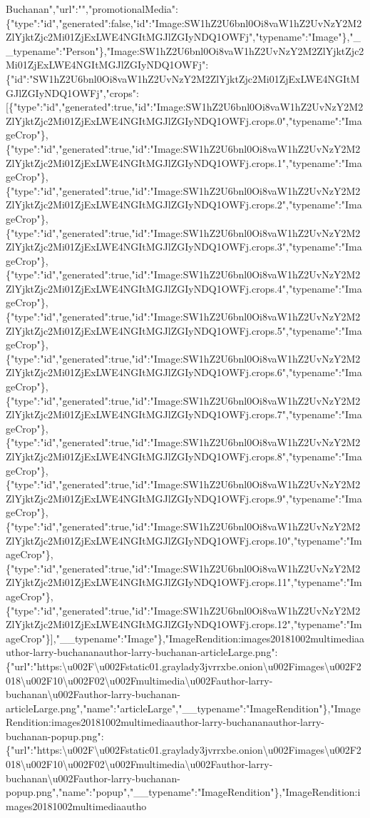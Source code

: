 Buchanan","url":"","promotionalMedia":\{"type":"id","generated":false,"id":"Image:SW1hZ2U6bnl0Oi8vaW1hZ2UvNzY2M2ZlYjktZjc2Mi01ZjExLWE4NGItMGJlZGIyNDQ1OWFj","typename":"Image"\},"\_\_typename":"Person"\},"Image:SW1hZ2U6bnl0Oi8vaW1hZ2UvNzY2M2ZlYjktZjc2Mi01ZjExLWE4NGItMGJlZGIyNDQ1OWFj":\{"id":"SW1hZ2U6bnl0Oi8vaW1hZ2UvNzY2M2ZlYjktZjc2Mi01ZjExLWE4NGItMGJlZGIyNDQ1OWFj","crops":{[}\{"type":"id","generated":true,"id":"Image:SW1hZ2U6bnl0Oi8vaW1hZ2UvNzY2M2ZlYjktZjc2Mi01ZjExLWE4NGItMGJlZGIyNDQ1OWFj.crops.0","typename":"ImageCrop"\},\{"type":"id","generated":true,"id":"Image:SW1hZ2U6bnl0Oi8vaW1hZ2UvNzY2M2ZlYjktZjc2Mi01ZjExLWE4NGItMGJlZGIyNDQ1OWFj.crops.1","typename":"ImageCrop"\},\{"type":"id","generated":true,"id":"Image:SW1hZ2U6bnl0Oi8vaW1hZ2UvNzY2M2ZlYjktZjc2Mi01ZjExLWE4NGItMGJlZGIyNDQ1OWFj.crops.2","typename":"ImageCrop"\},\{"type":"id","generated":true,"id":"Image:SW1hZ2U6bnl0Oi8vaW1hZ2UvNzY2M2ZlYjktZjc2Mi01ZjExLWE4NGItMGJlZGIyNDQ1OWFj.crops.3","typename":"ImageCrop"\},\{"type":"id","generated":true,"id":"Image:SW1hZ2U6bnl0Oi8vaW1hZ2UvNzY2M2ZlYjktZjc2Mi01ZjExLWE4NGItMGJlZGIyNDQ1OWFj.crops.4","typename":"ImageCrop"\},\{"type":"id","generated":true,"id":"Image:SW1hZ2U6bnl0Oi8vaW1hZ2UvNzY2M2ZlYjktZjc2Mi01ZjExLWE4NGItMGJlZGIyNDQ1OWFj.crops.5","typename":"ImageCrop"\},\{"type":"id","generated":true,"id":"Image:SW1hZ2U6bnl0Oi8vaW1hZ2UvNzY2M2ZlYjktZjc2Mi01ZjExLWE4NGItMGJlZGIyNDQ1OWFj.crops.6","typename":"ImageCrop"\},\{"type":"id","generated":true,"id":"Image:SW1hZ2U6bnl0Oi8vaW1hZ2UvNzY2M2ZlYjktZjc2Mi01ZjExLWE4NGItMGJlZGIyNDQ1OWFj.crops.7","typename":"ImageCrop"\},\{"type":"id","generated":true,"id":"Image:SW1hZ2U6bnl0Oi8vaW1hZ2UvNzY2M2ZlYjktZjc2Mi01ZjExLWE4NGItMGJlZGIyNDQ1OWFj.crops.8","typename":"ImageCrop"\},\{"type":"id","generated":true,"id":"Image:SW1hZ2U6bnl0Oi8vaW1hZ2UvNzY2M2ZlYjktZjc2Mi01ZjExLWE4NGItMGJlZGIyNDQ1OWFj.crops.9","typename":"ImageCrop"\},\{"type":"id","generated":true,"id":"Image:SW1hZ2U6bnl0Oi8vaW1hZ2UvNzY2M2ZlYjktZjc2Mi01ZjExLWE4NGItMGJlZGIyNDQ1OWFj.crops.10","typename":"ImageCrop"\},\{"type":"id","generated":true,"id":"Image:SW1hZ2U6bnl0Oi8vaW1hZ2UvNzY2M2ZlYjktZjc2Mi01ZjExLWE4NGItMGJlZGIyNDQ1OWFj.crops.11","typename":"ImageCrop"\},\{"type":"id","generated":true,"id":"Image:SW1hZ2U6bnl0Oi8vaW1hZ2UvNzY2M2ZlYjktZjc2Mi01ZjExLWE4NGItMGJlZGIyNDQ1OWFj.crops.12","typename":"ImageCrop"\}{]},"\_\_typename":"Image"\},"ImageRendition:images20181002multimediaauthor-larry-buchananauthor-larry-buchanan-articleLarge.png":\{"url":"https:\textbackslash{}u002F\textbackslash{}u002Fstatic01.graylady3jvrrxbe.onion\textbackslash{}u002Fimages\textbackslash{}u002F2018\textbackslash{}u002F10\textbackslash{}u002F02\textbackslash{}u002Fmultimedia\textbackslash{}u002Fauthor-larry-buchanan\textbackslash{}u002Fauthor-larry-buchanan-articleLarge.png","name":"articleLarge","\_\_typename":"ImageRendition"\},"ImageRendition:images20181002multimediaauthor-larry-buchananauthor-larry-buchanan-popup.png":\{"url":"https:\textbackslash{}u002F\textbackslash{}u002Fstatic01.graylady3jvrrxbe.onion\textbackslash{}u002Fimages\textbackslash{}u002F2018\textbackslash{}u002F10\textbackslash{}u002F02\textbackslash{}u002Fmultimedia\textbackslash{}u002Fauthor-larry-buchanan\textbackslash{}u002Fauthor-larry-buchanan-popup.png","name":"popup","\_\_typename":"ImageRendition"\},"ImageRendition:images20181002multimediaautho